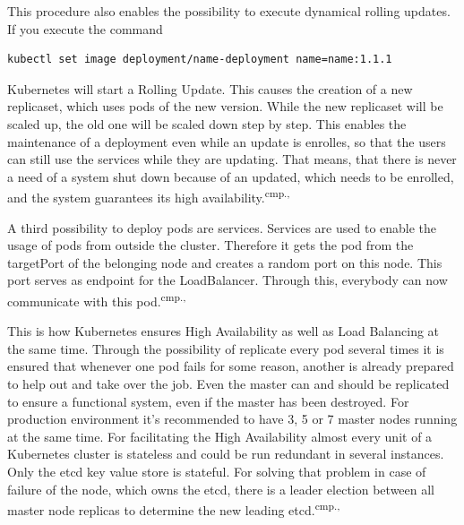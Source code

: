 This procedure also enables the possibility to execute dynamical rolling updates. If you execute the command
\begin{lstlisting}[caption={Create Kubernetes deployment},captionpos=b]
kubectl set image deployment/name-deployment name=name:1.1.1
\end{lstlisting}
Kubernetes will start a Rolling Update. This causes the creation of a new replicaset, which uses pods of the new version. While the new replicaset will be scaled up, the old one will be scaled down step by step. This enables the maintenance of a deployment even while an update is enrolles, so that the users can still use the services while they are updating. That means, that there is never a need of a system shut down because of an updated, which needs to be enrolled, and the system guarantees its high availability.\textsuperscript{cmp.\cite{13}, \cite{18}}

A third possibility to deploy pods are services. Services are used to enable the usage of pods from outside the cluster. Therefore it gets the pod from the targetPort of the belonging node and creates a random port on this node. This port serves as endpoint for the LoadBalancer. Through this, everybody can now communicate with this pod.\textsuperscript{cmp.\cite{13}, \cite{18}}

This is how Kubernetes ensures High Availability as well as Load Balancing at the same time. Through the possibility of replicate every pod several times it is ensured that whenever one pod fails for some reason, another is already prepared to help out and take over the job. Even the master can and should be replicated to ensure a functional system, even if the master has been destroyed. For production environment it's recommended to have 3, 5 or 7 master nodes running at the same time. For facilitating the High Availability almost every unit of a Kubernetes cluster is stateless and could be run redundant in several instances. Only the etcd key value store is stateful. For solving that problem in case of failure of the node, which owns the etcd, there is a leader election between all master node replicas to determine the new leading etcd.\textsuperscript{cmp.\cite{13}, \cite{18}}


